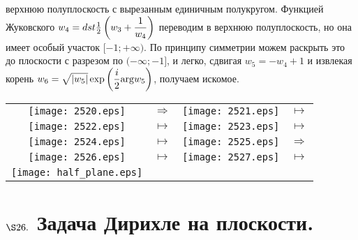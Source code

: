 верхнюю полуплоскость с вырезанным единичным полукругом. Функцией Жуковского
$w_4 = dst \frac{1}{2}\left( w_3+\displaystyle\frac{1}{w_4} \right)$ переводим в верхнюю
полуплоскость, но она имеет особый участок $[-1;+\infty)$. По принципу симметрии
можем раскрыть это до плоскости с разрезом по $(-\infty;-1]$, и легко, сдвигая
$w_5 = -w_4+1$ и извлекая корень $w_6 = \sqrt{\left| w_5 \right|}\exp \left(\displaystyle
    \frac{i}{2}\mathrm{arg} w_5\right)$, получаем искомое.
\begin{center}
    \begin{tabular}{cccc}
      \texttt{[image: 2520.eps]} & $\Rightarrow$ & \texttt{[image: 2521.eps]} & $\mapsto$ \\
      \texttt{[image: 2522.eps]} & $\mapsto$ & \texttt{[image: 2523.eps]} & $\mapsto$ \\
      \texttt{[image: 2524.eps]} & $\mapsto$ & \texttt{[image: 2525.eps]} & $\Rightarrow$ \\
      \texttt{[image: 2526.eps]} & $\mapsto$ & \texttt{[image: 2527.eps]} & $\mapsto$ \\
      \texttt{[image: half\_plane.eps]} & & & \\
    \end{tabular}
\end{center}
\section{$\S 26.$ Задача Дирихле на плоскости.}